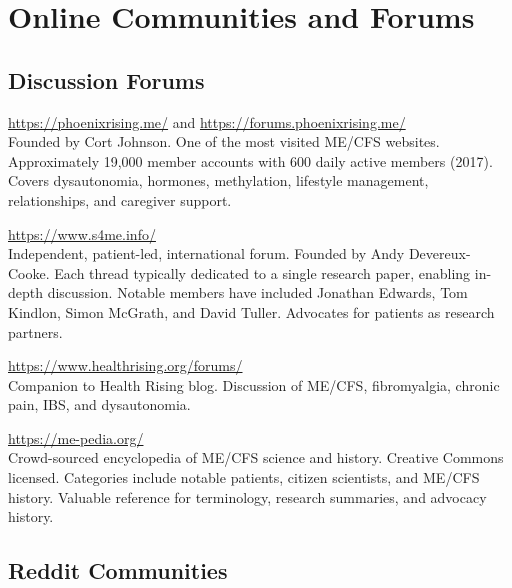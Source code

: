 \section{Online Communities and Forums}
\label{sec:online-communities}

\subsection{Discussion Forums}

\begin{description}[style=nextline]
\item[Phoenix Rising] \hfill \url{https://phoenixrising.me/} and \url{https://forums.phoenixrising.me/}\\
Founded by Cort Johnson. One of the most visited ME/CFS websites. Approximately 19,000 member accounts with 600 daily active members (2017). Covers dysautonomia, hormones, methylation, lifestyle management, relationships, and caregiver support.

\item[Science for ME (S4ME)] \hfill \url{https://www.s4me.info/}\\
Independent, patient-led, international forum. Founded by Andy Devereux-Cooke. Each thread typically dedicated to a single research paper, enabling in-depth discussion. Notable members have included Jonathan Edwards, Tom Kindlon, Simon McGrath, and David Tuller. Advocates for patients as research partners.

\item[Health Rising Forums] \hfill \url{https://www.healthrising.org/forums/}\\
Companion to Health Rising blog. Discussion of ME/CFS, fibromyalgia, chronic pain, IBS, and dysautonomia.

\item[MEpedia] \hfill \url{https://me-pedia.org/}\\
Crowd-sourced encyclopedia of ME/CFS science and history. Creative Commons licensed. Categories include notable patients, citizen scientists, and ME/CFS history. Valuable reference for terminology, research summaries, and advocacy history.
\end{description}

\subsection{Reddit Communities}


